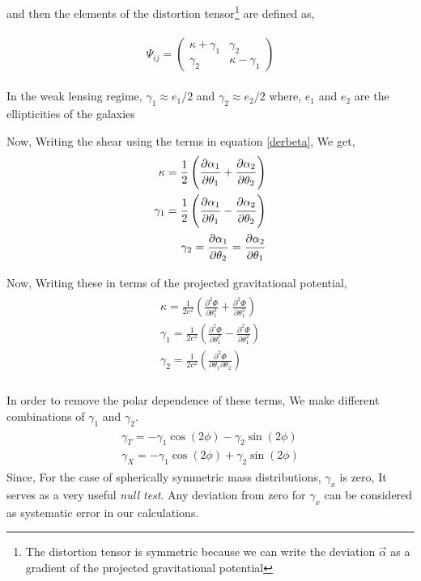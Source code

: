 and then the elements of the distortion tensor\footnote{The distortion tensor is symmetric because we can write the deviation $\vec{\alpha}$ as
  a gradient of the projected gravitational potential} are defined as,

\begin{align}
  \begin{split}
    \Psi_{ij} = 
    \begin{pmatrix}
      \kappa + \gamma_1 & \gamma_2 \\
      \gamma_2 & \kappa - \gamma_1 
    \end{pmatrix}
  \end{split}
\end{align}

In the weak lensing regime, $\gamma_1 \approx e_1/2$ and $\gamma_2 \approx e_2/2$ where, $e_1$ and $e_2$ are the ellipticities of the galaxies \cite{weaklensbook}

Now, Writing the shear using the terms in equation \eqref{derbeta}, We get,
\begin{align}
  \begin{split}
    \kappa = \frac12 \left( \dfrac{\strut \partial \alpha_1}{\strut \partial \theta_1} + \dfrac{\strut \partial \alpha_2}{\strut \partial \theta_2} \right)\\
    \gamma_1 = \frac12 \left( \dfrac{\strut \partial \alpha_1}{\strut \partial \theta_1} - \dfrac{\strut \partial \alpha_2}{\strut \partial \theta_2} \right)\\
    \gamma_2 = \dfrac{\strut \partial \alpha_1}{\strut \partial \theta_2} = \dfrac{\strut \partial \alpha_2}{\strut \partial \theta_1}\\
  \end{split}
\end{align}

Now, Writing these in terms of the projected gravitational potential,
\begin{align}
  \begin{split}
  \kappa = \frac{1}{2 c^2} \left(\frac{\partial^2 \Phi}{\partial \theta_1^2}+ \frac{\partial^2 \Phi}{\partial \theta_1^2} \right)\\
  \gamma_1 =\frac{1}{2 c^2} \left(\frac{\partial^2 \Phi}{\partial \theta_1^2} - \frac{\partial^2 \Phi}{\partial \theta_1^2} \right)\\
  \gamma_2 =\frac{1}{2 c^2} \left(\frac{\partial^2 \Phi}{\partial \theta_1 \partial \theta_2} \right)\\
  \end{split}
\end{align}

In order to remove the polar dependence of these terms, We make different combinations of $\gamma_1$ and $\gamma_2$.
\begin{align}
  \begin{split}
    \gamma_T = - \gamma_1 \cos(2\phi) - \gamma_2 \sin(2 \phi)\\
    \gamma_X = - \gamma_1 \cos(2\phi) + \gamma_2 \sin(2 \phi)
  \end{split}
\end{align}
Since, For the case of spherically symmetric mass distributions, $\gamma_x$ is zero, It serves as a very useful \emph{null test}.
Any deviation from zero for $\gamma_x$ can be considered as systematic error in our calculations.





